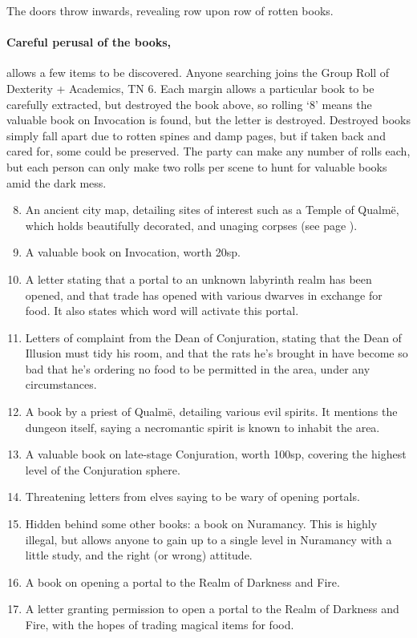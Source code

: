 \begin{multicols}{2}
\begin{boxtext}
  The doors throw inwards, revealing row upon row of rotten books.
\end{boxtext}

\paragraph{Careful perusal of the books,}
allows a few items to be discovered.
Anyone searching joins the Group Roll of Dexterity + Academics, TN 6.
Each margin allows a particular book to be carefully extracted, but destroyed the book above, so rolling `8' means the valuable book on Invocation is found, but the letter is destroyed.
Destroyed books simply fall apart due to rotten spines and damp pages, but if taken back and cared for, some could be preserved.
The party can make any number of rolls each, but each person can only make two rolls per scene to hunt for valuable books amid the dark mess.

\begin{enumerate}

\setcounter{enumi}{7}
  \item{An ancient city map, detailing sites of interest such as a Temple of Qualm\"{e}, which holds beautifully decorated, and unaging corpses (see page \pageref{green_tower})}.
  \item{A valuable book on Invocation, worth 20sp.}
  \item{A letter stating that a portal to an unknown labyrinth realm has been opened, and that trade has opened with various dwarves in exchange for food.  It also states which word will activate this portal.}
  \item{Letters of complaint from the Dean of Conjuration, stating that the Dean of Illusion must tidy his room, and that the rats he's brought in have become so bad that he's ordering no food to be permitted in the area, under any circumstances.}
  \item{A book by a priest of Qualm\"{e}, detailing various evil spirits.  It mentions the dungeon itself, saying a necromantic spirit is known to inhabit the area.}
  \item{A valuable book on late-stage Conjuration, worth 100sp, covering the highest level of the Conjuration sphere.}
  \item{Threatening letters from elves saying to be wary of opening portals.}
  \item{Hidden behind some other books: a book on Nuramancy.  This is highly illegal, but allows anyone to gain up to a single level in Nuramancy with a little study, and the right (or wrong) attitude.}
  \item{A book on opening a portal to the Realm of Darkness and Fire.}
  \item{A letter granting permission to open a portal to the Realm of Darkness and Fire, with the hopes of trading magical items for food.}


\end{enumerate}
\end{multicols}
